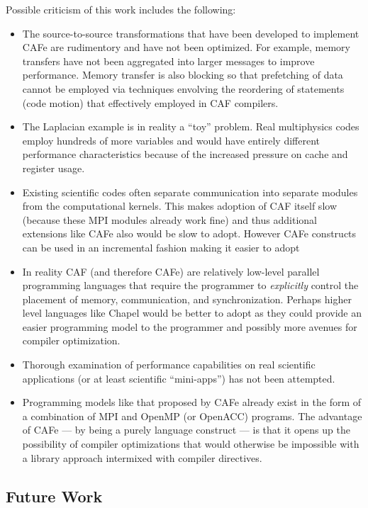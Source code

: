 Possible criticism of this work includes the following:
\begin{itemize}
\item
  The source-to-source transformations that have been developed to implement CAFe
  are rudimentory and have not been optimized.  For example, memory transfers have
  not been aggregated into larger messages to improve performance.  Memory transfer
  is also blocking so that prefetching of data cannot be employed via techniques
  envolving the reordering of statements (code motion) that effectively employed in
  CAF compilers.
\item
  The Laplacian example is in reality a ``toy'' problem.  Real multiphysics codes
  employ hundreds of more variables and would have entirely different performance
  characteristics because of the increased pressure on cache and register usage.
\item
  Existing scientific codes often separate communication into separate modules from
  the computational kernels.  This makes adoption of CAF itself slow (because these
  MPI modules already work fine) and thus additional extensions like CAFe also
  would be slow to adopt. However CAFe constructs can be used in an incremental
  fashion making it easier to adopt
\item
  In reality CAF (and therefore CAFe) are relatively low-level parallel programming
  languages that require the programmer to \emph{explicitly} control the placement
  of memory, communication, and synchronization.  Perhaps higher level languages like
  Chapel would be better to adopt as they could provide an easier programming model
  to the programmer and possibly more avenues for compiler optimization.
\item
  Thorough examination of performance capabilities on real scientific applications
  (or at least scientific ``mini-apps'') has not been attempted.
\item
  Programming models like that proposed by CAFe already exist in the form of a combination
  of MPI and OpenMP (or OpenACC) programs.  The advantage of CAFe --- by being a purely
  language construct --- is that it opens up the possibility of compiler optimizations
  that would otherwise be impossible with a library approach intermixed with compiler directives.
\end{itemize}

\subsection{Future Work}

